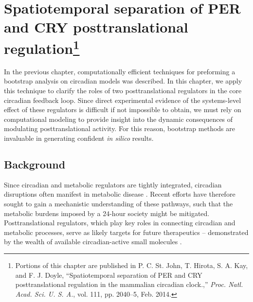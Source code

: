 \chapter[Spatiotemporal separation of PER and CRY posttranslational regulation]{Spatiotemporal separation of PER and CRY posttranslational regulation\footnote{Portions of this chapter are published in P. C. St. John, T. Hirota, S. A. Kay, and F. J. Doyle, ``Spatiotemporal separation of PER and CRY posttranslational regulation in the mammalian circadian clock.,'' {\itshape Proc. Natl. Acad. Sci. U. S. A.}, vol. 111, pp. 2040–5, Feb. 2014.}}\label{chap:longdaysin}

In the previous chapter, computationally efficient techniques for preforming a bootstrap analysis on circadian models was described. 
In this chapter, we apply this technique to clarify the roles of two posttranslational regulators in the core circadian feedback loop. 
Since direct experimental evidence of the systems-level effect of these regulators is difficult if not impossible to obtain, we must rely on computational modeling to provide insight into the dynamic consequences of modulating posttranslational activity. 
For this reason, bootstrap methods are invaluable in generating confident {\itshape in silico} results. 

\section{Background}

Since circadian and metabolic regulators are tightly integrated, circadian disruptions often manifest in metabolic disease \cite{Bass2012}. 
Recent efforts have therefore sought to gain a mechanistic understanding of these pathways, such that the metabolic burdens imposed by a 24-hour society might be mitigated. 
Posttranslational regulators, which play key roles in connecting circadian and metabolic processes, serve as likely targets for future therapeutics -- demonstrated by the wealth of available circadian-active small molecules \cite{Chen2013}.

